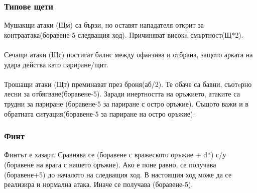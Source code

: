 \subsubsection{Типове щети}
Мушакщи атаки (Щм) са бързи, но оставят нападателя открит за контраатака(боравене-5 следващия ход).
Причиняват високa смъртност(Щ*2).
\\
\\
Сечащи атаки (Щс) постигат балнс между офанзива и отбрана, защото арката на удара действа като париране/щит.
\\
\\
Трошащи атаки (Щт) преминават през броня(аб/2).
Те обаче са бавни, съотeрно лесни за отбягване(боравене-5).
Заради инертността на оръжието, атаките са трудни за париране (боравене-5 за париране с остро оръжие).
Същото важи и в обратната ситуация(боравене-5 за париране на остро оръжие).


\subsubsection{Финт}
Финтът е хазарт.
Сравнява се (боравене с вражеското оръжие + d*) с/у (боравене на врага с нашето оръжие).
Ако е поне равно, се получава (боравене+5) до началото на следващия ход.
В настоящия ход може да се реализира и нормална атака.
Иначе се получава (боравене-5).


